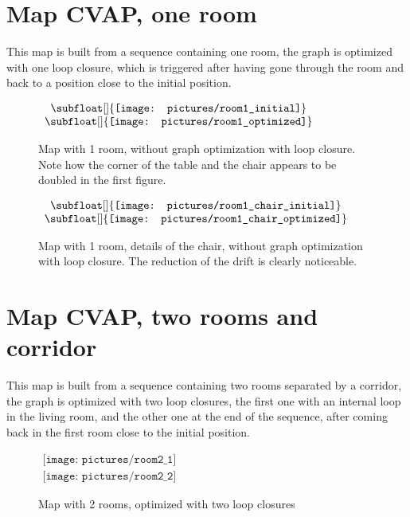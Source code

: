 \cleardoublepage
\section{Map CVAP, one room}

This map is built from a sequence containing one room, the graph is optimized with one loop closure, which is triggered after having gone through the room and back to a position close to the initial position. 

\begin{figure}[H]
\centering$
\begin{array}{c}
\subfloat[]{\label{fig:room1_1}\texttt{[image: pictures/room1\_initial]}} \\
\subfloat[]{\label{fig:room1_2}\texttt{[image: pictures/room1\_optimized]}}
 \end{array}$
\caption{Map with 1 room,  \protect{} without graph optimization \protect{} with loop closure. Note how the corner of the table and the chair appears to be doubled in the first figure.}
\end{figure}

\begin{figure}[H]
\centering$
\begin{array}{c}
\subfloat[]{\label{fig:room1_chair_1}\texttt{[image: pictures/room1\_chair\_initial]}} \\
\subfloat[]{\label{fig:room1_chair_2}\texttt{[image: pictures/room1\_chair\_optimized]}}
\end{array}$
\caption{Map with 1 room, details of the chair, \protect{} without graph optimization \protect{} with loop closure. The reduction of the drift is clearly noticeable.}
\end{figure}

\clearpage
\section{Map CVAP, two rooms and corridor}

This map is built from a sequence containing two rooms separated by a corridor, the graph is optimized with two loop closures, the first one with an internal loop in the living room, and the other one at the end of the sequence, after coming back in the first room close to the initial position. 

\begin{figure}[H]
\centering$
 \begin{array}{c}
 \texttt{[image: pictures/room2\_1]}\\
 \texttt{[image: pictures/room2\_2]}
 \end{array}$
\caption{Map with 2 rooms, optimized with two loop closures}
\end{figure}

